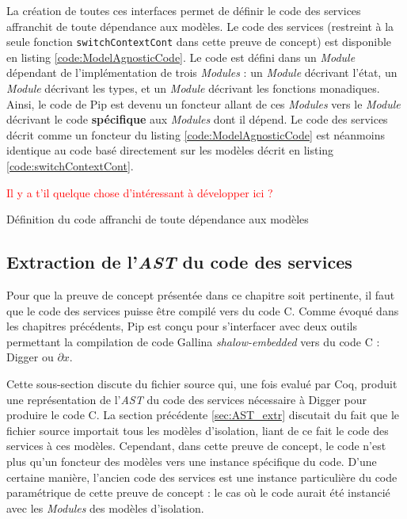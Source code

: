 			La création de toutes ces interfaces permet de définir le code des services affranchit de toute dépendance aux modèles. Le code des services (restreint à la seule fonction \texttt{switchContextCont} dans cette preuve de concept) est disponible en listing \ref{code:ModelAgnosticCode}. Le code est défini dans un \emph{Module} dépendant de l'implémentation de trois \emph{Modules} : un \emph{Module} décrivant l'état, un \emph{Module} décrivant les types, et un \emph{Module} décrivant les fonctions monadiques. Ainsi, le code de Pip est devenu un foncteur allant de ces \emph{Modules} vers le \emph{Module} décrivant le code \textbf{spécifique} aux \emph{Modules} dont il dépend. Le code des services décrit comme un foncteur du listing \ref{code:ModelAgnosticCode} est néanmoins identique au code basé directement sur les modèles décrit en listing \ref{code:switchContextCont}.

			\textcolor{red}{Il y a t'il quelque chose d'intéressant à développer ici ?}

			\begin{listing}[!ht]
				\caption{Définition du code affranchi de toute dépendance aux modèles}
				\label{code:ModelAgnosticCode}
			\end{listing}

		\subsection{Extraction de l'\emph{AST} du code des services}

		Pour que la preuve de concept présentée dans ce chapitre soit pertinente, il faut que le code des services puisse être compilé vers du code C. Comme évoqué dans les chapitres précédents, Pip est conçu pour s'interfacer avec deux outils permettant la compilation de code Gallina \emph{shalow-embedded} vers du code C : Digger ou $\partial x$.

		Cette sous-section discute du fichier source qui, une fois evalué par Coq, produit une représentation de l'\emph{AST} du code des services nécessaire à Digger pour produire le code C. La section précédente \ref{sec:AST_extr} discutait du fait que le fichier source importait tous les modèles d'isolation, liant de ce fait le code des services à ces modèles. Cependant, dans cette preuve de concept, le code n'est plus qu'un foncteur des modèles vers une instance spécifique du code. D'une certaine manière, l'ancien code des services est une instance particulière du code paramétrique de cette preuve de concept : le cas où le code aurait été instancié avec les \emph{Modules} des modèles d'isolation.

